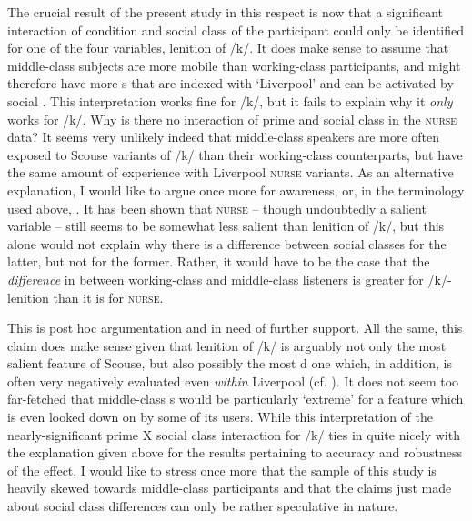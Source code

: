 The crucial result of the present study in this respect is now that a significant interaction of  condition and social class of the participant could only be identified for one of the four variables, lenition of /k/.
It does make sense to assume that middle-class subjects are more mobile than working-class participants, and might therefore have more s that are indexed with `Liverpool' and can be activated by social .
This interpretation works fine for /k/, but it fails to explain why it \emph{only} works for /k/.
Why is there no interaction of prime and social class in the \textsc{nurse} data?
It seems very unlikely indeed that middle-class speakers are more often exposed to Scouse variants of /k/ than their working-class counterparts, but have the same amount of experience with Liverpool \textsc{nurse} variants.
As an alternative explanation, I would like to argue once more for awareness, or, in the terminology used above, .
It has been shown that \textsc{nurse} -- though undoubtedly a salient variable -- still seems to be somewhat less salient than lenition of /k/, but this alone would not explain why there is a difference between social classes for the latter, but not for the former.
Rather, it would have to be the case that the \emph{difference} in  between working-class and middle-class listeners is greater for /k/-lenition than it is for \textsc{nurse}.

This is post hoc argumentation and in need of further support.
All the same, this claim does make sense given that lenition of /k/ is arguably not only the most salient feature of Scouse, but also possibly the most d one which, in addition, is often very negatively evaluated even \emph{within} Liverpool (cf. ).
It does not seem too far-fetched that middle-class s would be particularly `extreme' for a feature which is even looked down on by some of its users.
While this interpretation of the nearly-significant prime X social class interaction for /k/ ties in quite nicely with the explanation given above for the results pertaining to accuracy and robustness of the  effect, I would like to stress once more that the sample of this study is heavily skewed towards middle-class participants and that the claims just made about social class differences can only be rather speculative in nature.

